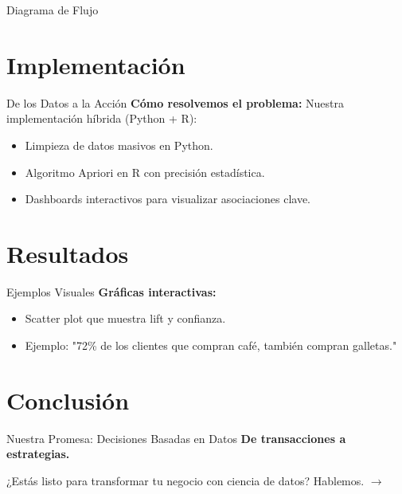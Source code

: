 \documentclass{beamer}
\begin{document}
\begin{frame}{Diagrama de Flujo}
    \centering
\end{frame}

\section{Implementación}
\begin{frame}{De los Datos a la Acción}
    \textbf{Cómo resolvemos el problema:}  
    Nuestra implementación híbrida (Python + R):  
    \begin{itemize}
        \item Limpieza de datos masivos en Python.
        \item Algoritmo Apriori en R con precisión estadística.
        \item Dashboards interactivos para visualizar asociaciones clave.
    \end{itemize}
\end{frame}

\section{Resultados}
\begin{frame}{Ejemplos Visuales}
    \textbf{Gráficas interactivas:}  
    \begin{itemize}
        \item Scatter plot que muestra lift y confianza.
        \item Ejemplo: "72\% de los clientes que compran café, también compran galletas."
    \end{itemize}
\end{frame}

\section{Conclusión}
\begin{frame}{Nuestra Promesa: Decisiones Basadas en Datos}
    \centering
    \Huge
    \textbf{De transacciones a estrategias.}
    
    \vspace{1em}
    \Large
    ¿Estás listo para transformar tu negocio con ciencia de datos? Hablemos. $\rightarrow$
\end{frame}
\end{document}
